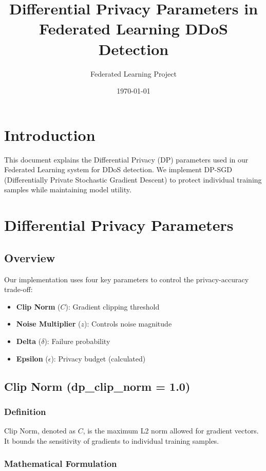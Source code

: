 \documentclass[12pt,a4paper]{article}
\title{Differential Privacy Parameters in Federated Learning DDoS Detection}
\author{Federated Learning Project}
\date{\today}
\begin{document}
\maketitle

\section{Introduction}

This document explains the Differential Privacy (DP) parameters used in our Federated Learning system for DDoS detection. We implement DP-SGD (Differentially Private Stochastic Gradient Descent) to protect individual training samples while maintaining model utility.

\section{Differential Privacy Parameters}

\subsection{Overview}

Our implementation uses four key parameters to control the privacy-accuracy trade-off:

\begin{itemize}
    \item \textbf{Clip Norm} ($C$): Gradient clipping threshold
    \item \textbf{Noise Multiplier} ($z$): Controls noise magnitude
    \item \textbf{Delta} ($\delta$): Failure probability
    \item \textbf{Epsilon} ($\epsilon$): Privacy budget (calculated)
\end{itemize}

\subsection{Clip Norm (dp\_clip\_norm = 1.0)}

\subsubsection{Definition}

Clip Norm, denoted as $C$, is the maximum L2 norm allowed for gradient vectors. It bounds the sensitivity of gradients to individual training samples.

\subsubsection{Mathematical Formulation}
\end{document}
